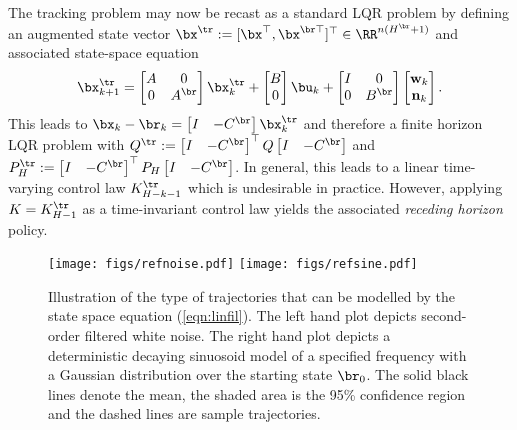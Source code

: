 The tracking problem may now be recast as a standard LQR problem by defining an augmented state vector $\bx^{\tr} := [\bx^\top, \bx^{\br\top}]^\top \in \RR^{n(H^{\br}+1)}$ and associated state-space equation
\begin{equation}
\bx^{\tr}_{k+1} = \begin{bmatrix} A & 0 \\ 0 & A^{\br} \end{bmatrix} \bx^{\tr}_k +
\begin{bmatrix} B \\ 0\end{bmatrix} \bu_k +
\begin{bmatrix} I & 0 \\ 0 & B^{\br} \end{bmatrix} \begin{bmatrix}\mathbf{w}_k \\ \mathbf{n}_k \end{bmatrix}.
\end{equation}
This leads to $\bx_k - \br_k = \begin{bmatrix} I & -C^{\br} \end{bmatrix}\bx^{\tr}_k$ and therefore a finite horizon LQR problem with $Q^{\tr} := \begin{bmatrix} I & -C^{\br} \end{bmatrix}^\top Q \begin{bmatrix} I & -C^{\br} \end{bmatrix}$ and  $P_H^{\tr} := \begin{bmatrix} I & -C^{\br} \end{bmatrix}^\top P_H \begin{bmatrix} I & -C^{\br} \end{bmatrix}$. In general, this leads to a linear time-varying control law $K^{\tr}_{H-k-1}$ which is undesirable in practice. However, applying $K = K^{\tr}_{H-1}$ as a time-invariant control law yields the associated \textit{receding horizon} policy.







\begin{figure}[t] %
\centering
\texttt{[image: figs/refnoise.pdf]}
\texttt{[image: figs/refsine.pdf]}
\caption{Illustration of the type of trajectories that can be modelled by the state space equation (\ref{eqn:linfil}). The left hand plot depicts second-order filtered white noise. The right hand plot depicts a deterministic decaying sinuosoid model of a specified frequency with a Gaussian distribution over the starting state $\br_0$. The solid black lines denote the mean, the shaded area is the 95\% confidence region and the dashed lines are sample trajectories.}
\label{figs:examplerefs}
\end{figure} %





